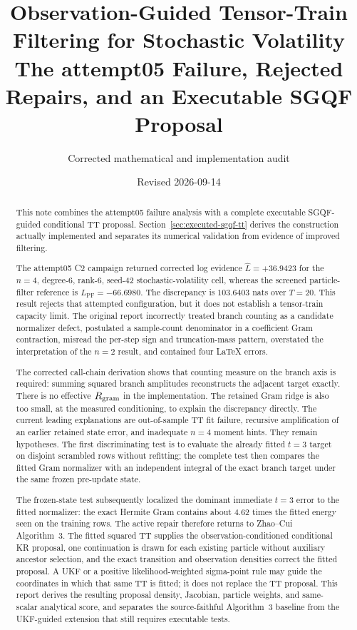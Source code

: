 \documentclass[11pt]{article}
\title{Observation-Guided Tensor-Train Filtering for Stochastic Volatility\\
\large The attempt05 Failure, Rejected Repairs, and an Executable SGQF Proposal}
\author{Corrected mathematical and implementation audit}
\date{Revised 2026-09-14}
\begin{document}
\maketitle

\begin{abstract}
This note combines the attempt05 failure analysis with a complete executable
SGQF-guided conditional TT proposal. Section~\ref{sec:executed-sgqf-tt}
derives the construction actually implemented and separates its numerical
validation from evidence of improved filtering.

The attempt05 C2 campaign returned corrected log evidence
$\widehat L=+36.9423$ for the $n=4$, degree-6, rank-6, seed-42
stochastic-volatility cell, whereas the screened particle-filter reference is
$L_{\mathrm{PF}}=-66.6980$. The discrepancy is $103.6403$ nats over $T=20$.
This result rejects that attempted configuration, but it does not establish a
tensor-train capacity limit. The original report incorrectly treated branch
counting as a candidate normalizer defect, postulated a sample-count
denominator in a coefficient Gram contraction, misread the per-step sign and
truncation-mass pattern, overstated the interpretation of the $n=2$ result,
and contained four LaTeX errors.

The corrected call-chain derivation shows that counting measure on the branch
axis is required: summing squared branch amplitudes reconstructs the adjacent
target exactly. There is no effective $R_{\rm gram}$ in the implementation.
The retained Gram ridge is also too small, at the measured conditioning, to
explain the discrepancy directly. The current leading explanations are
out-of-sample TT fit failure, recursive amplification of an earlier retained
state error, and inadequate $n=4$ moment hints. They remain hypotheses. The
first discriminating test is to evaluate the already fitted $t=3$ target on
disjoint scrambled rows without refitting; the complete test then compares the
fitted Gram normalizer with an independent integral of the exact branch target
under the same frozen pre-update state.

The frozen-state test subsequently localized the dominant immediate $t=3$
error to the fitted normalizer: the exact Hermite Gram contains about $4.62$
times the fitted energy seen on the training rows.  The active repair therefore
returns to Zhao--Cui Algorithm~3.  The fitted squared TT supplies the
observation-conditioned conditional KR proposal, one continuation is drawn for
each existing particle without auxiliary ancestor selection, and the exact
transition and observation densities correct the fitted proposal.  A UKF or a
positive likelihood-weighted sigma-point rule may guide the coordinates in
which that same TT is fitted; it does not replace the TT proposal.  This report
derives the resulting proposal density, Jacobian, particle weights, and
same-scalar analytical score, and separates the source-faithful Algorithm~3
baseline from the UKF-guided extension that still requires executable tests.
\end{abstract}
\end{document}

